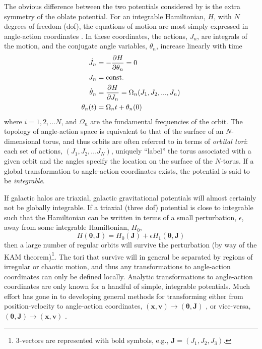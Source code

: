 \documentclass[letterpaper,12pt,preprint]{aastex}
\newcommand{\bs}[1]{\boldsymbol{#1}}
\newcommand{\act}{J}
\begin{document}
The obvious difference between the two potentials considered by \citet{pearson15} is the extra symmetry of the oblate potential. For an integrable Hamiltonian, $H$, with $N$ degrees of freedom (dof), the equations of motion are most simply expressed in angle-action coordinates \cite[e.g.,][]{goldstein80}. In these coordinates, the actions, $J_n$, are integrals of the motion, and the conjugate angle variables, $\theta_n$, increase linearly with time
\begin{align}
	\dot{\act}_n &= -\frac{\partial H}{\partial \theta_n} = 0\\
	\act_n &= {\rm const.}\\
	\dot{\theta}_n &= \frac{\partial H}{\partial \act_n} = \Omega_n(\act_1,\act_2,...,\act_n)\label{eq:aafreq}\\
	\theta_n(t) &= \Omega_n t + \theta_n(0)
\end{align}
where $i=1,2,...N$, and $\Omega_n$ are the fundamental frequencies of the orbit. The topology of angle-action space is equivalent to that of the surface of an $N$-dimensional torus, and thus orbits are often referred to in terms of \emph{orbital tori}: each set of actions, $(\act_1,\act_2,...\act_N)$, uniquely ``label'' the torus associated with a given orbit and the angles specify the location on the surface of the $N$-torus. If a global transformation to angle-action coordinates exists, the potential is said to be \emph{integrable}.

If galactic halos are triaxial, galactic gravitational potentials will almost certainly not be globally integrable. If a triaxial (three dof) potential is close to integrable such that the Hamiltonian can be written in terms of a small perturbation, $\epsilon$, away from some integrable Hamiltonian, $H_0$,
\begin{equation}
	H(\bs{\theta}, \bs{\act}) = H_0(\bs{\act}) + \epsilon H_1(\bs{\theta}, \bs{\act})
\end{equation}
then a large number of regular orbits will survive the perturbation (by way of the KAM theorem)\footnote{3-vectors are represented with bold symbols, e.g., $\bs{J}=(J_1,J_2,J_3)$.}. The tori that survive will in general be separated by regions of irregular or chaotic motion, and thus any transformations to angle-action coordinates can only be defined locally. Analytic transformations to angle-action coordinates are only known for a handful of simple, integrable potentials. Much effort has gone in to developing general methods for transforming either from position-velocity to angle-action coordinates, $(\bs{x},\bs{v})\rightarrow(\bs{\theta},\bs{J})$ \citep{many}, or vice-versa, $(\bs{\theta},\bs{J})\rightarrow(\bs{x},\bs{v})$ \citep{many}.
\end{document}

